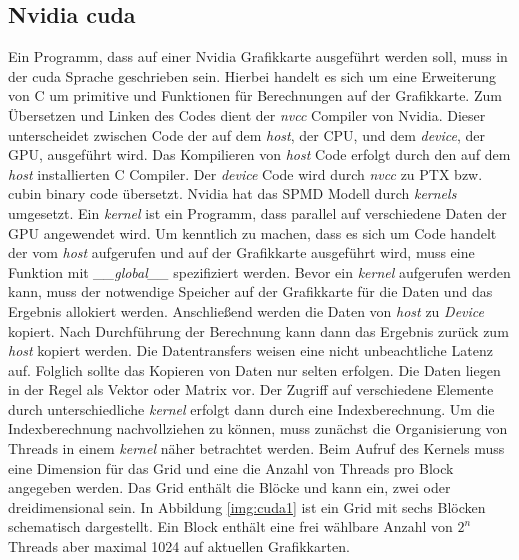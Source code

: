 \subsection{Nvidia cuda}

Ein Programm, dass auf einer Nvidia Grafikkarte ausgeführt werden soll, muss in der cuda Sprache geschrieben sein. Hierbei handelt es sich um eine Erweiterung von C um primitive und Funktionen für Berechnungen auf der Grafikkarte. Zum Übersetzen und Linken des Codes dient der \textit{nvcc} Compiler von Nvidia. Dieser unterscheidet zwischen Code der auf dem \textit{host}, der CPU, und dem \textit{device}, der GPU, ausgeführt wird. Das Kompilieren von \textit{host} Code erfolgt durch den auf dem \textit{host} installierten C Compiler. Der \textit{device} Code wird durch \textit{nvcc} zu PTX bzw. cubin binary code übersetzt.
Nvidia hat das SPMD Modell durch \textit{kernels} umgesetzt. Ein \textit{kernel} ist ein Programm, dass parallel auf verschiedene Daten der GPU angewendet wird. Um kenntlich zu machen, dass es sich um Code handelt der vom \textit{host} aufgerufen und auf der Grafikkarte ausgeführt wird, muss eine Funktion mit \textit{\_\_global\_\_} spezifiziert werden.
Bevor ein \textit{kernel} aufgerufen werden kann, muss der notwendige Speicher auf der Grafikkarte für die Daten und das Ergebnis allokiert werden. Anschließend werden die Daten von \textit{host} zu \textit{Device} kopiert. Nach Durchführung der Berechnung kann dann das Ergebnis zurück zum \textit{host} kopiert werden. Die Datentransfers weisen eine nicht unbeachtliche Latenz auf. Folglich sollte das Kopieren von Daten nur selten erfolgen.
Die Daten liegen in der Regel als Vektor oder Matrix vor. Der Zugriff auf verschiedene Elemente durch unterschiedliche \textit{kernel} erfolgt dann durch eine Indexberechnung.
Um die Indexberechnung nachvollziehen zu können, muss zunächst die Organisierung von Threads in einem \textit{kernel} näher betrachtet werden. Beim Aufruf des Kernels muss eine Dimension für das Grid und eine die Anzahl von Threads pro Block angegeben werden. Das Grid enthält die Blöcke und kann ein, zwei oder dreidimensional sein. In Abbildung \ref{img:cuda1} ist ein Grid mit sechs Blöcken schematisch dargestellt. Ein Block enthält eine frei wählbare Anzahl von $2^n$ Threads aber maximal 1024 auf aktuellen Grafikkarten.

